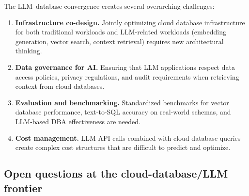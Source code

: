 \documentclass[a4paper,fleqn]{cas-sc}
\begin{document}
The LLM--database convergence creates several overarching challenges:

\begin{enumerate}
    \item \textbf{Infrastructure co-design.} Jointly optimizing cloud database infrastructure for both traditional workloads and LLM-related workloads (embedding generation, vector search, context retrieval) requires new architectural thinking.

    \item \textbf{Data governance for AI.} Ensuring that LLM applications respect data access policies, privacy regulations, and audit requirements when retrieving context from cloud databases.

    \item \textbf{Evaluation and benchmarking.} Standardized benchmarks for vector database performance, text-to-SQL accuracy on real-world schemas, and LLM-based DBA effectiveness are needed.

    \item \textbf{Cost management.} LLM API calls combined with cloud database queries create complex cost structures that are difficult to predict and optimize.
\end{enumerate}

\subsection{Open questions at the cloud-database/LLM frontier}
\label{subsec:llmquestions}
\end{document}

